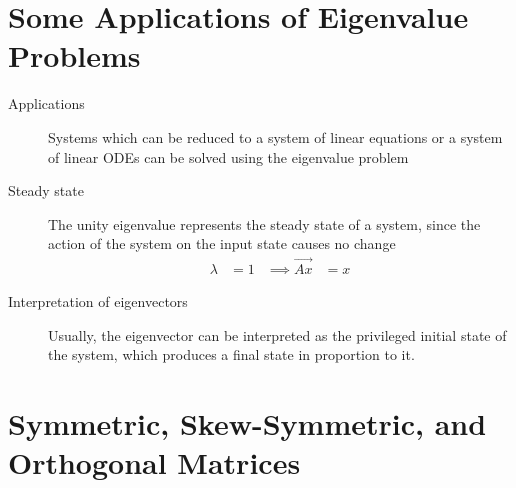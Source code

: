 \section{Some Applications of Eigenvalue Problems}

\begin{description}
    \item[Applications] Systems which can be reduced to a system of linear equations or
        a system of linear ODEs can be solved using the eigenvalue problem

    \item[Steady state] The unity eigenvalue represents the steady state of a system,
        since the action of the system on the input state causes no change
        \begin{align}
            \lambda & = 1 & \implies \vec{Ax} & = x
        \end{align}

    \item[Interpretation of eigenvectors] Usually, the eigenvector can be interpreted as
        the privileged initial state of the system, which produces a final state in
        proportion to it.
\end{description}

\section{Symmetric, Skew-Symmetric, and Orthogonal Matrices}

